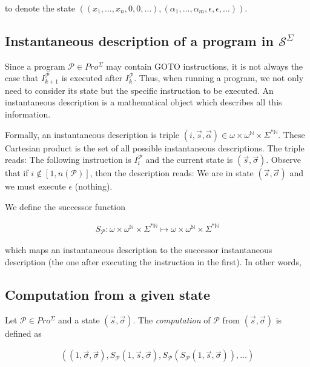 \documentclass[a4paper, 12pt]{article}
\begin{document}
to denote the state $\left( (x_1, \ldots, x_n, 0, 0, \ldots), (\alpha_1, \ldots,
\alpha_m, \epsilon, \epsilon,\ldots) \right) $.

\subsection{Instantaneous description of a program in $\mathcal{S}^{\Sigma}$}

Since a program $\mathcal{P} \in Pro^{\Sigma}$ may contain GOTO instructions,
it is not always the case that $I_{k+1}^{\mathcal{P}}$ is executed after
$I_k^{\mathcal{P}}$. Thus, when running a program, we not only need to consider
its state but the specific instruction to be executed. An instantaneous
description is a mathematical object which describes all this information.

Formally, an instantaneous description is triple $(i, \overrightarrow{s},
\overrightarrow{\alpha}) \in \omega \times \omega^{\mathbb{N}} \times
\Sigma^{*\mathbb{N}}$. These Cartesian product is the set of all possible
instantaneous descriptions. The triple reads: The following instruction is
$I_{i}^{\mathcal{P}}$ and the current state is $(\overrightarrow{s},
\overrightarrow{\sigma})$. Observe that if $i \not\in [1, n(\mathcal{P})]$, then
the description reads: We are in state $(\overrightarrow{s},
\overrightarrow{\sigma})$ and we must execute $\epsilon$ (nothing).

We define the successor function

\begin{align*}
    S_\mathcal{P} : \omega \times \omega^{\mathbb{N}} \times
    \Sigma^{*\mathbb{N}} \mapsto  \omega \times \omega^{\mathbb{N}} \times \Sigma^{*\mathbb{N}}
\end{align*}

which maps an instantaneous description to the successor instantaneous
description (the one after executing the instruction in the first). In other
words, 

\subsection{Computation from a given state}

Let $\mathcal{P} \in Pro^{\Sigma}$ and a state  $(\overrightarrow{s},
\overrightarrow{\sigma})$. The \textit{computation} of $\mathcal{P}$ from
$(\overrightarrow{s}, \overrightarrow{\sigma})$ is defined as 

\begin{align*}
    \left(  (1, \overrightarrow{\sigma}, \overrightarrow{\sigma}),
    S_{\mathcal{P}}\left( 1, \overrightarrow{s}, \overrightarrow{\sigma}
\right), S_{\mathcal{P}} \left( S_{\mathcal{P}} \left( 1, \overrightarrow{s},
\overrightarrow{\sigma} \right)  \right), \ldots   \right) 
\end{align*}
\end{document}
